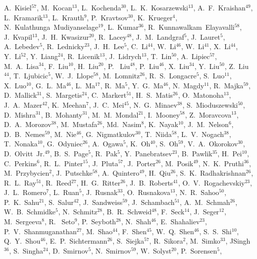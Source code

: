 \documentclass[%
 reprint,	
 amsmath,amssymb,
 aps,
 prc,
]{revtex4-1}
\begin{document}
{A.~Kisiel$^{57}$,
M.~Kocan$^{13}$,
L.~Kochenda$^{30}$,
L.~K.~Kosarzewski$^{13}$,
A.~F.~Kraishan$^{49}$,
L.~Kramarik$^{13}$,
L.~Krauth$^{9}$,
P.~Kravtsov$^{30}$,
K.~Krueger$^{4}$,
N.~Kulathunga~Mudiyanselage$^{19}$,
L.~Kumar$^{36}$,
R.~Kunnawalkam~Elayavalli$^{58}$,
J.~Kvapil$^{13}$,
J.~H.~Kwasizur$^{20}$,
R.~Lacey$^{48}$,
J.~M.~Landgraf$^{5}$,
J.~Lauret$^{5}$,
A.~Lebedev$^{5}$,
R.~Lednicky$^{23}$,
J.~H.~Lee$^{5}$,
C.~Li$^{44}$,
W.~Li$^{46}$,
W.~Li$^{41}$,
X.~Li$^{44}$,
Y.~Li$^{52}$,
Y.~Liang$^{24}$,
R.~Licenik$^{13}$,
J.~Lidrych$^{13}$,
T.~Lin$^{50}$,
A.~Lipiec$^{57}$,
M.~A.~Lisa$^{34}$,
F.~Liu$^{10}$,
H.~Liu$^{20}$,
P.~ Liu$^{48}$,
P.~Liu$^{46}$,
X.~Liu$^{34}$,
Y.~Liu$^{50}$,
Z.~Liu$^{44}$,
T.~Ljubicic$^{5}$,
W.~J.~Llope$^{58}$,
M.~Lomnitz$^{26}$,
R.~S.~Longacre$^{5}$,
S.~Luo$^{11}$,
X.~Luo$^{10}$,
G.~L.~Ma$^{46}$,
L.~Ma$^{17}$,
R.~Ma$^{5}$,
Y.~G.~Ma$^{46}$,
N.~Magdy$^{11}$,
R.~Majka$^{59}$,
D.~Mallick$^{31}$,
S.~Margetis$^{24}$,
C.~Markert$^{51}$,
H.~S.~Matis$^{26}$,
O.~Matonoha$^{13}$,
J.~A.~Mazer$^{42}$,
K.~Meehan$^{7}$,
J.~C.~Mei$^{45}$,
N.~G.~Minaev$^{38}$,
S.~Mioduszewski$^{50}$,
D.~Mishra$^{31}$,
B.~Mohanty$^{31}$,
M.~M.~Mondal$^{21}$,
I.~Mooney$^{58}$,
Z.~Moravcova$^{13}$,
D.~A.~Morozov$^{38}$,
M.~Mustafa$^{26}$,
Md.~Nasim$^{8}$,
K.~Nayak$^{10}$,
J.~M.~Nelson$^{6}$,
D.~B.~Nemes$^{59}$,
M.~Nie$^{46}$,
G.~Nigmatkulov$^{30}$,
T.~Niida$^{58}$,
L.~V.~Nogach$^{38}$,
T.~Nonaka$^{10}$,
G.~Odyniec$^{26}$,
A.~Ogawa$^{5}$,
K.~Oh$^{40}$,
S.~Oh$^{59}$,
V.~A.~Okorokov$^{30}$,
D.~Olvitt~Jr.$^{49}$,
B.~S.~Page$^{5}$,
R.~Pak$^{5}$,
Y.~Panebratsev$^{23}$,
B.~Pawlik$^{35}$,
H.~Pei$^{10}$,
C.~Perkins$^{6}$,
R.~L.~Pinter$^{15}$,
J.~Pluta$^{57}$,
J.~Porter$^{26}$,
M.~Posik$^{49}$,
N.~K.~Pruthi$^{36}$,
M.~Przybycien$^{2}$,
J.~Putschke$^{58}$,
A.~Quintero$^{49}$,
H.~Qiu$^{26}$,
S.~K.~Radhakrishnan$^{26}$,
R.~L.~Ray$^{51}$,
R.~Reed$^{27}$,
H.~G.~Ritter$^{26}$,
J.~B.~Roberts$^{41}$,
O.~V.~Rogachevskiy$^{23}$,
J.~L.~Romero$^{7}$,
L.~Ruan$^{5}$,
J.~Rusnak$^{33}$,
O.~Rusnakova$^{13}$,
N.~R.~Sahoo$^{50}$,
P.~K.~Sahu$^{21}$,
S.~Salur$^{42}$,
J.~Sandweiss$^{59}$,
J.~Schambach$^{51}$,
A.~M.~Schmah$^{26}$,
W.~B.~Schmidke$^{5}$,
N.~Schmitz$^{28}$,
B.~R.~Schweid$^{48}$,
F.~Seck$^{14}$,
J.~Seger$^{12}$,
M.~Sergeeva$^{8}$,
R.~ Seto$^{9}$,
P.~Seyboth$^{28}$,
N.~Shah$^{46}$,
E.~Shahaliev$^{23}$,
P.~V.~Shanmuganathan$^{27}$,
M.~Shao$^{44}$,
F.~Shen$^{45}$,
W.~Q.~Shen$^{46}$,
S.~S.~Shi$^{10}$,
Q.~Y.~Shou$^{46}$,
E.~P.~Sichtermann$^{26}$,
S.~Siejka$^{57}$,
R.~Sikora$^{2}$,
M.~Simko$^{33}$,
JSingh$^{36}$,
S.~Singha$^{24}$,
D.~Smirnov$^{5}$,
N.~Smirnov$^{59}$,
W.~Solyst$^{20}$,
P.~Sorensen$^{5}$,
}
\end{document}
